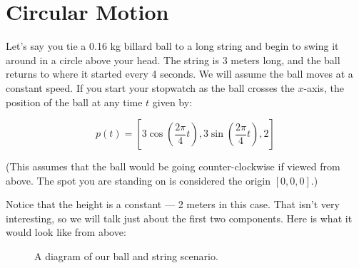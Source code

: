 \chapter{Circular Motion}

Let's say you tie a 0.16 kg billard ball to a long string and begin to swing
it around in a circle above your head. The string is 3
meters long, and the ball returns to where it started every 4
seconds. We will assume the ball moves at a constant speed. If you start your stopwatch as the ball crosses the
$x$-axis, the position of the ball at any time $t$ given by:

$$p(t) = [3 \cos{\left( \frac{2 \pi} {4}t\right)}, 3 \sin{ \left( \frac{2 \pi}{4}t\right) }, 2]$$

(This assumes that the ball would be going counter-clockwise if viewed
from above. The spot you are standing on is considered the origin $[0, 0, 0]$.)

Notice that the height is a constant --- 2 meters in this
case. That isn't very interesting, so we will talk just about the
first two components.  Here is what it would look like from above:


\begin{figure}[htbp]
    \begin{center}
        
    \end{center}
        \caption{A diagram of our ball and string scenario.}
    \label{fig:billiardBall}
\end{figure}

